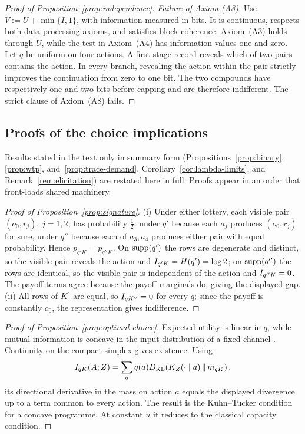 \begin{proof}[Proof of Proposition~\ref{prop:independence}]
\emph{Failure of Axiom \textup{(A8)}.}
Use $V:=U+\min\{I,1\}$, with information measured in bits.  It is continuous, respects both data-processing axioms,
and satisfies block coherence.  Axiom~\textup{(A3)} holds through $U$, while the test in Axiom~\textup{(A4)}
has information values one and zero.  Let $q$ be uniform on four actions.  A first-stage record reveals which of two pairs
contains the action.  In every branch, revealing the action within the pair strictly improves the continuation from
zero to one bit.  The two compounds have respectively one and two bits before capping and are therefore indifferent.
The strict clause of Axiom~\textup{(A8)} fails.
\end{proof}

\subsection{Proofs of the choice implications}\label{app:choice-proofs}

Results stated in the text only in summary form (Propositions~\ref{prop:binary}, \ref{prop:wtp},
and~\ref{prop:trace-demand}, Corollary~\ref{cor:lambda-limits}, and Remark~\ref{rem:elicitation}) are restated here
in full.  Proofs appear in an order that front-loads shared machinery.

\begin{proof}[Proof of Proposition~\ref{prop:signature}]
(i) Under either lottery, each visible pair $(o_0,r_j)$, $j=1,2$, has probability $\tfrac12$: under $q'$ because
each $a_j$ produces $(o_0,r_j)$ for sure, under $q''$ because each of $a_3,a_4$ produces either pair with equal
probability.  Hence $p_{q'K}=p_{q''K}$.  On $\operatorname{supp}(q')$ the rows are degenerate and distinct, so the visible pair
reveals the action and $I_{q'K}=H(q')=\log2$; on $\operatorname{supp}(q'')$ the rows are identical, so the visible pair is
independent of the action and $I_{q''K}=0$.  The payoff terms agree because the payoff marginals do, giving the
displayed gap.
(ii) All rows of $K^\circ$ are equal, so $I_{qK^\circ}=0$ for every $q$; since the payoff is constantly $o_0$,
the representation gives indifference.
\end{proof}

\begin{proof}[Proof of Proposition~\ref{prop:optimal-choice}]
Expected utility is linear in $q$, while mutual information is concave in the input distribution of a fixed channel
\cite{CoverThomas2006}.  Continuity on the compact simplex gives existence.  Using
\[
 I_{qK}(A;Z)=\sum_aq(a)D_{\mathrm{KL}}\!\left(K_Z(\cdot\mid a)\,\middle\|\,m_{qK}\right),
\]
its directional derivative in the mass on action $a$ equals the displayed divergence up to a term common to every
action.  The result is the Kuhn--Tucker condition for a concave programme.  At constant $u$ it reduces to the classical
capacity condition.
\end{proof}


